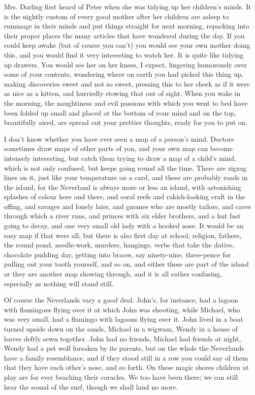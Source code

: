 Mrs. Darling first heard of Peter when she was tidying up her children's minds.
It is the nightly custom of every good mother after her children are asleep to rummage in their minds and put things straight for next morning, repacking into their proper places the many articles that have wandered during the day.
If you could keep awake (but of course you can't) you would see your own mother doing this, and you would find it very interesting to watch her.
It is quite like tidying up drawers.
You would see her on her knees, I expect, lingering humorously over some of your contents, wondering where on earth you had picked this thing up, making discoveries sweet and not so sweet, pressing this to her cheek as if it were as nice as a kitten, and hurriedly stowing that out of sight.
When you wake in the morning, the naughtiness and evil passions with which you went to bed have been folded up small and placed at the bottom of your mind and on the top, beautifully aired, are spread out your prettier thoughts, ready for you to put on.

I don't know whether you have ever seen a map of a person's mind.
Doctors sometimes draw maps of other parts of you, and your own map can become intensely interesting, but catch them trying to draw a map of a child's mind, which is not only confused, but keeps going round all the time.
There are zigzag lines on it, just like your temperature on a card, and these are probably roads in the island, for the Neverland is always more or less an island, with astonishing splashes of colour here and there, and coral reefs and rakish-looking craft in the offing, and savages and lonely lairs, and gnomes who are mostly tailors, and caves through which a river runs, and princes with six elder brothers, and a hut fast going to decay, and one very small old lady with a hooked nose.
It would be an easy map if that were all, but there is also first day at school, religion, fathers, the round pond, needle-work, murders, hangings, verbs that take the dative, chocolate pudding day, getting into braces, say ninety-nine, three-pence for pulling out your tooth yourself, and so on, and either these are part of the island or they are another map showing through, and it is all rather confusing, especially as nothing will stand still.

Of course the Neverlands vary a good deal.
John's, for instance, had a lagoon with flamingoes flying over it at which John was shooting, while Michael, who was very small, had a flamingo with lagoons flying over it.
John lived in a boat turned upside down on the sands, Michael in a wigwam, Wendy in a house of leaves deftly sewn together.
John had no friends, Michael had friends at night, Wendy had a pet wolf forsaken by its parents, but on the whole the Neverlands have a family resemblance, and if they stood still in a row you could say of them that they have each other's nose, and so forth.
On these magic shores children at play are for ever beaching their coracles.
We too have been there; we can still hear the sound of the surf, though we shall land no more.

